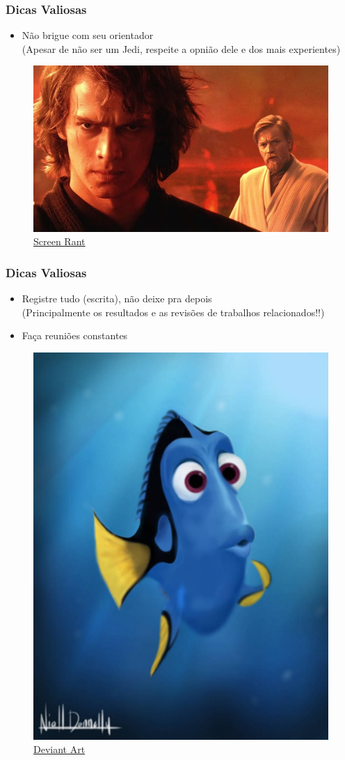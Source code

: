 \begin{frame}
    \frametitle{Dicas Valiosas}
        \begin{itemize}
            \item Não brigue com seu orientador \\
            {\small (Apesar de não ser um Jedi, respeite a opnião dele e dos mais experientes)}
        \end{itemize}
        \begin{figure}
            \centering
            \includegraphics[width=0.8\linewidth]{figs/Obi-Wan-and-Anakin.png}
            \caption{\href{https://screenrant.com/star-wars-obi-wan-left-anakin-to-die-reason/}{Screen Rant}}
        \end{figure}
\end{frame}

\begin{frame}
    \frametitle{Dicas Valiosas}
        \begin{itemize}
            \item Registre tudo (escrita), não deixe pra depois \\
            (Principalmente os resultados e as revisões de trabalhos relacionados!!)
            \item Faça reuniões constantes
        \end{itemize}
        \begin{figure}
            \centering
            \includegraphics[width=0.3\linewidth]{figs/dory.jpg}
            \caption{\href{https://www.deviantart.com/the-avenged-evil/art/Finding-Nemo-Dory-325470391}{Deviant Art}}
        \end{figure}
\end{frame}

